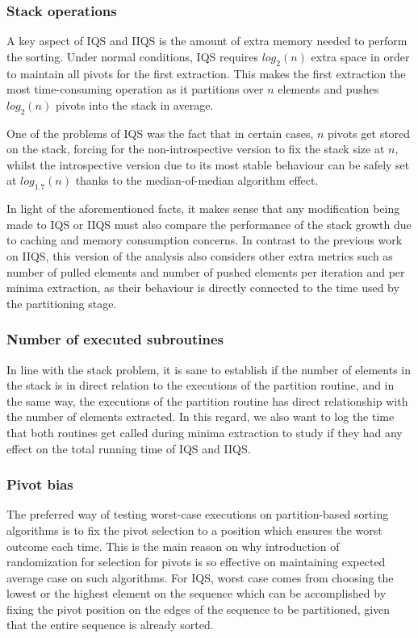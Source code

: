 \subsubsection{Stack operations}
A key aspect of IQS and IIQS is the amount of extra memory needed to perform the sorting. Under normal conditions, IQS requires $log_2(n)$ extra space in order to maintain all pivots for the first extraction. This makes the first extraction the most time-consuming operation as it partitions over $n$ elements and pushes $log_2(n)$ pivots into the stack in average.

One of the problems of IQS was the fact that in certain cases, $n$ pivots get stored on the stack, forcing for the non-introspective version to fix the stack size at $n$, whilst the introspective version due to its most stable behaviour can be safely set at $log_{1.7}(n)$ thanks to the median-of-median algorithm effect.

In light of the aforementioned facts, it makes sense that any modification being made to IQS or IIQS must also compare the performance of the stack growth due to caching and memory consumption concerns. In contrast to the previous work on IIQS, this version of the analysis also considers other extra metrics such as number of pulled elements and number of pushed elements per iteration and per minima extraction, as their behaviour is directly connected to the time used by the partitioning stage.

\subsubsection{Number of executed subroutines}
In line with the stack problem, it is sane to establish if the number of elements in the stack is in direct relation to the executions of the partition routine, and in the same way, the executions of the partition routine has direct relationship with the number of elements extracted. In this regard, we also want to log the time that both routines get called during minima extraction to study if they had any effect on the total running time of IQS and IIQS.

\subsubsection{Pivot bias}
The preferred way of testing worst-case executions on partition-based sorting algorithms is to fix the pivot selection to a position which ensures the worst outcome each time. This is the main reason on why introduction of randomization for selection for pivots is so effective on maintaining expected average case on such algorithms. For IQS, worst case comes from choosing the lowest or the highest element on the sequence which can be accomplished by fixing the pivot position on the edges of the sequence to be partitioned, given that the entire sequence is already sorted.

